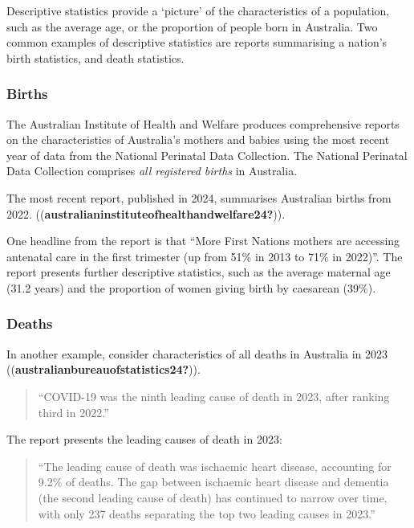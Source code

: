\documentclass[
  a4paper,
]{memoir}
\begin{document}
Descriptive statistics provide a `picture' of the characteristics of a
population, such as the average age, or the proportion of people born in
Australia. Two common examples of descriptive statistics are reports
summarising a nation's birth statistics, and death statistics.

\hypertarget{births}{%
\subsubsection{Births}\label{births}}

The Australian Institute of Health and Welfare produces comprehensive
reports on the characteristics of Australia's mothers and babies using
the most recent year of data from the National Perinatal Data
Collection. The National Perinatal Data Collection comprises \emph{all
registered births} in Australia.

The most recent report, published in 2024, summarises Australian births
from 2022. ((\textbf{australianinstituteofhealthandwelfare24?})).

One headline from the report is that ``More First Nations mothers are
accessing antenatal care in the first trimester (up from 51\% in 2013 to
71\% in 2022)''. The report presents further descriptive statistics,
such as the average maternal age (31.2 years) and the proportion of
women giving birth by caesarean (39\%).

\hypertarget{deaths}{%
\subsubsection{Deaths}\label{deaths}}

In another example, consider characteristics of all deaths in Australia
in 2023 ((\textbf{australianbureauofstatistics24?})).

\begin{quote}
``COVID-19 was the ninth leading cause of death in 2023, after ranking
third in 2022.''
\end{quote}

The report presents the leading causes of death in 2023:

\begin{quote}
``The leading cause of death was ischaemic heart disease, accounting for
9.2\% of deaths. The gap between ischaemic heart disease and dementia
(the second leading cause of death) has continued to narrow over time,
with only 237 deaths separating the top two leading causes in 2023.''
\end{quote}
\end{document}
